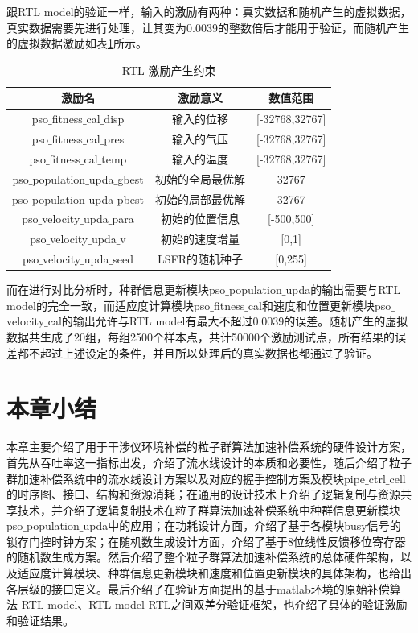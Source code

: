 跟RTL model的验证一样，输入的激励有两种：真实数据和随机产生的虚拟数据，真实数据需要先进行处理，让其变为0.0039的整数倍后才能用于验证，而随机产生的虚拟数据激励如表\ref{tab:RTL激励产生约束}所示。
\begin{table}[H]
    \centering
    \caption{RTL 激励产生约束}
    \label{tab:RTL激励产生约束}
    \begin{tabular}{c|c|c}
        \hline
        激励名                                    & 激励意义                   &  数值范围                  \\ \hline
        pso$\_$fitness$\_$cal$\_$disp            & 输入的位移                  &  [-32768,32767]           \\ \hline
        pso$\_$fitness$\_$cal$\_$pres            & 输入的气压                  &  [-32768,32767]           \\ \hline
        pso$\_$fitness$\_$cal$\_$temp            & 输入的温度                  &  [-32768,32767]           \\ \hline
        pso$\_$population$\_$upda$\_$gbest       & 初始的全局最优解            &  32767                     \\ \hline
        pso$\_$population$\_$upda$\_$pbest       & 初始的局部最优解            &  32767                     \\ \hline
        pso$\_$velocity$\_$upda$\_$para         & 初始的位置信息               & [-500,500]                \\ \hline
        pso$\_$velocity$\_$upda$\_$v            & 初始的速度增量               & [0,1]                      \\ \hline
        pso$\_$velocity$\_$upda$\_$seed         & LSFR的随机种子              & [0,255]                 \\ \hline
    \end{tabular}
  \end{table}

而在进行对比分析时，种群信息更新模块pso$\_$population$\_$upda的输出需要与RTL model的完全一致，而适应度计算模块pso$\_$fitness$\_$cal和速度和位置更新模块pso$\_$velocity$\_$cal的输出允许与RTL model有最大不超过0.0039的误差。随机产生的虚拟数据共生成了20组，每组2500个样本点，共计50000个激励测试点，所有结果的误差都不超过上述设定的条件，并且所以处理后的真实数据也都通过了验证。

\section{本章小结}
本章主要介绍了用于干涉仪环境补偿的粒子群算法加速补偿系统的硬件设计方案，首先从吞吐率这一指标出发，介绍了流水线设计的本质和必要性，随后介绍了粒子群加速补偿系统中的流水线设计方案以及对应的握手控制方案及模块pipe$\_$ctrl$\_$cell的时序图、接口、结构和资源消耗；在通用的设计技术上介绍了逻辑复制与资源共享技术，并介绍了逻辑复制技术在粒子群算法加速补偿系统中种群信息更新模块pso$\_$population$\_$upda中的应用；在功耗设计方面，介绍了基于各模块busy信号的锁存门控时钟方案；在随机数生成设计方面，介绍了基于8位线性反馈移位寄存器的随机数生成方案。然后介绍了整个粒子群算法加速补偿系统的总体硬件架构，以及适应度计算模块、种群信息更新模块和速度和位置更新模块的具体架构，也给出各层级的接口定义。最后介绍了在验证方面提出的基于matlab环境的原始补偿算法-RTL model、RTL model-RTL之间双差分验证框架，也介绍了具体的验证激励和验证结果。
